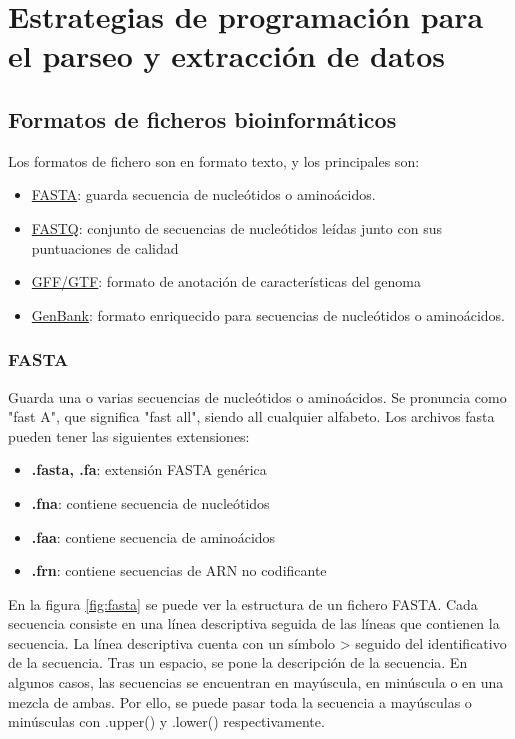 \chapter{Estrategias de programación para el parseo y extracción de datos}
\section{Formatos de ficheros bioinformáticos}
Los formatos de fichero son en formato texto, y los principales son:
\begin{itemize}
\item \underline{FASTA}: guarda secuencia de nucleótidos o aminoácidos.
\item \underline{FASTQ}: conjunto de secuencias de nucleótidos leídas junto con sus puntuaciones de calidad
\item \underline{GFF/GTF}: formato de anotación de características del genoma
\item \underline{GenBank}: formato enriquecido para secuencias de nucleótidos o aminoácidos.
\end{itemize}

\subsection{FASTA}
Guarda una o varias secuencias de nucleótidos o aminoácidos. Se pronuncia como "fast A", que significa "fast all", siendo all cualquier alfabeto. Los archivos fasta pueden tener las siguientes extensiones:
\begin{itemize}
\item \textbf{.fasta, .fa}: extensión FASTA genérica
\item \textbf{.fna}: contiene secuencia de nucleótidos
\item \textbf{.faa}: contiene secuencia de aminoácidos
\item \textbf{.frn}: contiene secuencias de ARN no codificante
\end{itemize}

En la figura \ref{fig:fasta} se puede ver la estructura de un fichero FASTA. Cada secuencia consiste en una línea descriptiva seguida de las líneas que contienen la secuencia. La línea descriptiva cuenta con un símbolo > seguido del identificativo de la secuencia. Tras un espacio, se pone la descripción de la secuencia. En algunos casos, las secuencias se encuentran en mayúscula, en minúscula o en una mezcla de ambas. Por ello, se puede pasar toda la secuencia a mayúsculas o minúsculas con .upper() y .lower() respectivamente.


